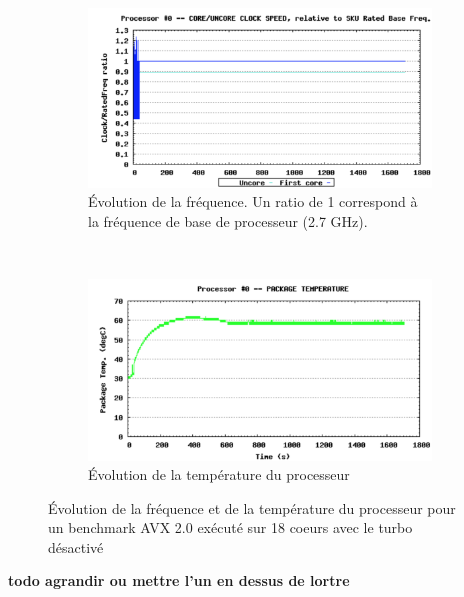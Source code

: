            
    \begin{figure}[!h]
        \centering
        \begin{subfigure}[t]{0.45\linewidth}
            \includegraphics[width=\linewidth]{images/kg_freq.png}
            \caption{Évolution de la fréquence. Un ratio de 1 correspond à la fréquence de base de processeur (2.7 GHz).}
            \label{pic_kg_freq}
        \end{subfigure}
        ~ %
        \begin{subfigure}[t]{0.45\linewidth}
            \includegraphics[width=\linewidth]{images/kg_temp.png}
            \caption{Évolution de la température du processeur}
            \label{pic_kg_temp}
        \end{subfigure}
        \caption{Évolution de la fréquence et de la température du processeur pour un benchmark AVX 2.0 exécuté sur 18 coeurs avec le turbo désactivé}\label{pic_kg_freq_vs_temp}
    \end{figure}
    \textbf{todo agrandir ou mettre l'un en dessus de lortre}

